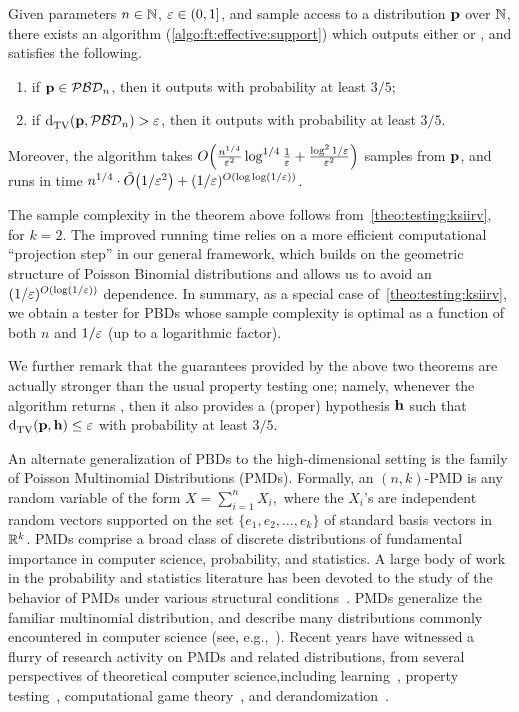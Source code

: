 \begin{theorem}\label{theo:testing:[bd}
    Given parameters $n\in\N$, $\eps\in(0,1]$, and sample access to a distribution $\p$ over $\N$, there exists an algorithm (\cref{algo:ft:effective:support}) which outputs either \accept or \reject, and satisfies the following.
    \begin{enumerate}
        \item if $\p \in \classpbd[n]$, then it outputs \accept with probability at least $3/5$;
        \item if $\totalvardist{\p}{\classpbd[n]} > \eps$, then it outputs \reject with probability at least $3/5$.
    \end{enumerate}
    Moreover, the algorithm takes $\bigO{\frac{n^{1/4}}{\eps^2}\log^{1/4}\frac{1}{\eps} + \frac{\log^2 1/\eps}{\eps^2}}$ samples from $\p$, and runs in time $n^{1/4}\cdot\tildeO{{1}/{\eps^2}}+(1/\eps)^{\bigO{\log\log(1/\eps)}}$.
\end{theorem}

The sample complexity in the theorem above follows from~\cref{theo:testing:ksiirv}, for $k=2$. 
The improved running time relies on a more efficient computational ``projection step''  in our general framework,
which builds on the geometric structure of Poisson Binomial distributions and allows us to avoid an $(1/\eps)^{\bigO{\log(1/\eps)}}$ dependence. 
In summary, as a special case of~\cref{theo:testing:ksiirv}, we obtain a tester for PBDs 
whose sample complexity is optimal as a function of both $n$ and $1/\eps$ (up to a logarithmic factor).

We further remark that the guarantees provided by the above two theorems 
are actually stronger than the usual property testing one; namely, whenever the algorithm returns \accept, 
then it also provides a (proper) hypothesis $\h$ such that $\totalvardist{\p}{\h}\leq \eps$ with probability at least $3/5$.


An alternate generalization of PBDs to the high-dimensional setting is the family of
Poisson Multinomial Distributions (PMDs).
Formally, an $(n, k)$-PMD is any random variable of the form $X = \sum_{i=1}^n X_i,$
where the $X_i$'s are independent random vectors supported on the set
$\{e_1, e_2, \ldots, e_k \}$ of standard basis vectors in $\R^k$.
PMDs comprise a broad class of discrete distributions of fundamental importance in computer science, probability, and statistics.
A large body of work in the probability and statistics literature has been devoted to the study of the behavior
of PMDs under various structural conditions~\cite{Barbour:88, Loh:92, BHJ:92, Bentkus:03, Roos:99, Roos:10}.
PMDs generalize the familiar multinomial distribution, and describe many distributions commonly encountered in computer science (see, e.g.,~\cite{DP:07:AGT, DP:08:AGT, Valiant:11,VV:11:stoc}).
Recent years have witnessed a flurry of research activity on PMDs and related distributions,
from several perspectives of theoretical computer science,including learning~\cite{DDS:PBD:15, DDOST:13, DKS:15, DKT:15, DKS:15b}, property testing~\cite{Valiant:11, ValiantValiant:10lb, VV:11:stoc}, computational game theory~\cite{DP:07:AGT, DP:08:AGT, BorgsCIKMP08, DP:09:AGT, DP:14:AGT, GT14,CDS:17},
 and derandomization~\cite{GMRZ:11, BDS:12, De:15, GKM:15}. 


